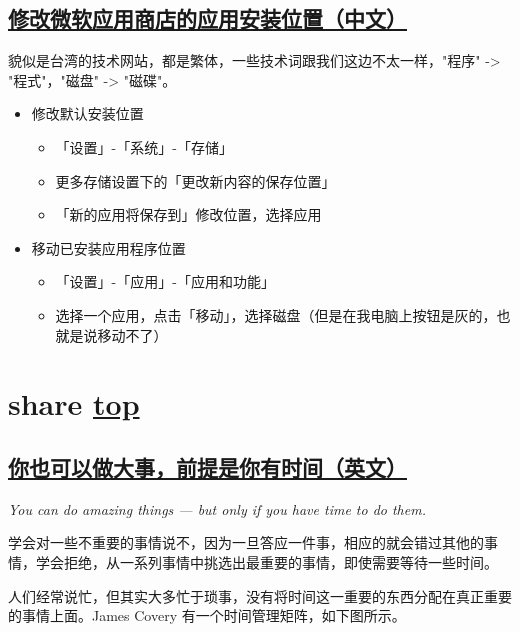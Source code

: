 \subsection{\href{https://ithelp.ithome.com.tw/articles/10254562}{修改微软应用商店的应用安装位置（中文）}}

貌似是台湾的技术网站，都是繁体，一些技术词跟我们这边不太一样，"程序" -> "程式"，"磁盘" -> "磁碟"。

\begin{itemize}
\item 修改默认安装位置
\begin{itemize}
    \item 「设置」-「系统」-「存储」
    \item 更多存储设置下的「更改新内容的保存位置」
    \item 「新的应用将保存到」修改位置，选择应用
\end{itemize}
\item 移动已安装应用程序位置
\begin{itemize}
    \item 「设置」-「应用」-「应用和功能」
    \item 选择一个应用，点击「移动」，选择磁盘（但是在我电脑上按钮是灰的，也就是说移动不了）
\end{itemize}
\end{itemize}

\section{share \hyperref[chap:w6]{top}}\label{w6:share}

\subsection{\href{https://medium.com/the-ascent/you-can-do-amazing-things-but-only-if-you-have-time-to-do-them-31c07ab5b04e}{你也可以做大事，前提是你有时间（英文）}}

\textit{You can do amazing things — but only if you have time to do them.}

学会对一些不重要的事情说不，因为一旦答应一件事，相应的就会错过其他的事情，学会拒绝，从一系列事情中挑选出最重要的事情，即使需要等待一些时间。

人们经常说忙，但其实大多忙于琐事，没有将时间这一重要的东西分配在真正重要的事情上面。James Covery 有一个时间管理矩阵，如下图所示。

